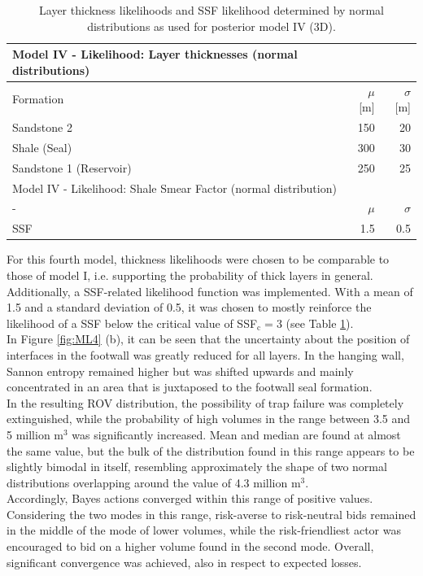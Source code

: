 		\begin{table}[h]
			\centering
			\begin{tabular}{lrr} 
				\toprule
				Model IV - Likelihood: Layer thicknesses (normal distributions)\\  
				\midrule 
				Formation & $\mu$ [m] & $\sigma$ [m]\\ 
				\midrule 
				Sandstone 2 & 150 & 20 \\
				Shale (Seal) & 300 & 30\\ 
				Sandstone 1 (Reservoir) & 250 & 25 \\
				\bottomrule
				\toprule
				Model IV - Likelihood: Shale Smear Factor (normal distribution)\\
				\midrule
				- & $\mu$ & $\sigma$\\
				\midrule
				SSF & 1.5 & 0.5\\
				\bottomrule
			\end{tabular}
			\caption{Layer thickness likelihoods and SSF likelihood determined by normal distributions as used for posterior model IV (3D).}
			\label{tab:ML4_likelihoods}
		\end{table}
		For this fourth model, thickness likelihoods were chosen to be comparable to those of model I, i.e. supporting the probability of thick layers in general. Additionally, a SSF-related likelihood function was implemented. With a mean of 1.5 and a standard deviation of 0.5, it was chosen to mostly reinforce the likelihood of a SSF below the critical value of SSF$_\text{c} = 3$ (see Table \ref{tab:ML4_likelihoods}).\\
		In Figure \ref{fig:ML4} (b), it can be seen that the uncertainty about the position of interfaces in the footwall was greatly reduced for all layers. In the hanging wall, Sannon entropy remained higher but was shifted upwards and mainly concentrated in an area that is juxtaposed to the footwall seal formation.\\
		In the resulting ROV distribution, the possibility of trap failure was completely extinguished, while the probability of high volumes in the range between 3.5  and 5 million m$^3$ was significantly increased. Mean and median are found at almost the same value, but the bulk of the distribution found in this range appears to be slightly bimodal in itself, resembling approximately the shape of two normal distributions overlapping around the value of 4.3 million m$^3$.\\
		Accordingly, Bayes actions converged within this range of positive values. Considering the two modes in this range, risk-averse to risk-neutral bids remained in the middle of the mode of lower volumes, while the risk-friendliest actor was encouraged to bid on a higher volume found in the second mode. Overall, significant convergence was achieved, also in respect to expected losses.\\		
